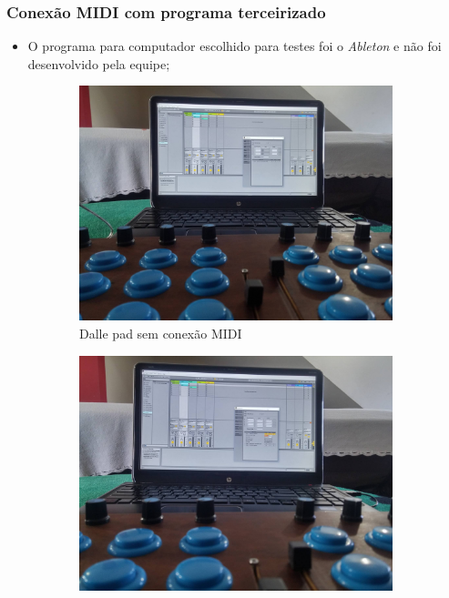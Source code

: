\documentclass[hyperref={pdfpagelabels=false}]{beamer}
\begin{document}
            \begin{frame}\frametitle{Conexão MIDI com programa terceirizado}

                \begin{itemize}
                  \item O programa para computador escolhido para testes foi o \textit{Ableton} e não foi desenvolvido pela equipe;
                 \end{itemize}
                        \begin{figure}[H]
                        	\centering
                            \begin{subfigure}[b]{.45\textwidth}
                                \centering
                                \includegraphics[scale=0.08]{Imagens/ableton1.jpg}
                            	\caption[Dalle pad sem conexão MIDI]{Dalle pad sem conexão MIDI}
                                \label{fig:shield-midi}
                            \end{subfigure} %
                            \begin{subfigure}[b]{.45\textwidth}
                                \centering
                                \includegraphics[scale=0.08]{Imagens/ableton2.jpg}

\end{subfigure}
\end{figure}
\end{frame}
\end{document}

